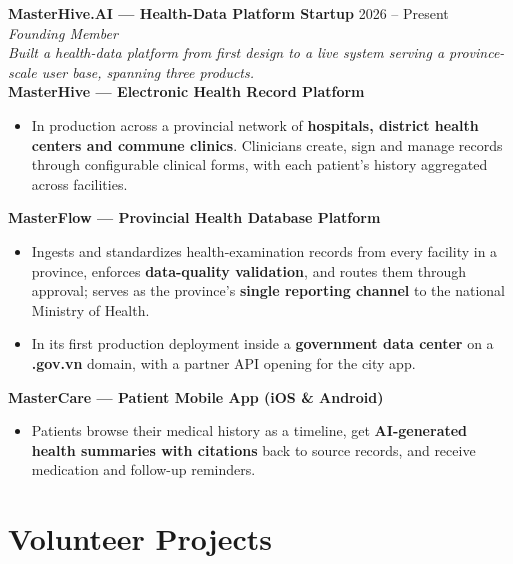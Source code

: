 \documentclass[10pt, letterpaper]{article}
\newenvironment{zitemize}{
\begin{itemize} \itemsep 0pt \parskip 0pt \parsep 1pt}
{\end{itemize}\vspace{-.5em}}
\begin{document}
\textbf{MasterHive.AI — Health-Data Platform Startup} \hfill 2026 – Present \\
\textit{Founding Member} \\
\vspace{2mm}
\textit{\small{Built a health-data platform from first design to a live system serving a province-scale user base, spanning three products.}}\\
\vspace{2mm}
\textbf{\small{MasterHive — Electronic Health Record Platform}}
\begin{zitemize}
    \vspace{-1mm}\item \small{In production across a provincial network of \textbf{hospitals, district health centers and commune clinics}. Clinicians create, sign and manage records through configurable clinical forms, with each patient's history aggregated across facilities.}
\end{zitemize}

\textbf{\small{MasterFlow — Provincial Health Database Platform}}
\begin{zitemize}
    \vspace{-1mm}\item \small{Ingests and standardizes health-examination records from every facility in a province, enforces \textbf{data-quality validation}, and routes them through approval; serves as the province's \textbf{single reporting channel} to the national Ministry of Health.}
    \item \small{In its first production deployment inside a \textbf{government data center} on a \textbf{.gov.vn} domain, with a partner API opening for the city app.}
\end{zitemize}

\textbf{\small{MasterCare — Patient Mobile App (iOS \& Android)}}
\begin{zitemize}
    \vspace{-1mm}\item \small{Patients browse their medical history as a timeline, get \textbf{AI-generated health summaries with citations} back to source records, and receive medication and follow-up reminders.}
\end{zitemize}

\section{Volunteer Projects}
\end{document}
